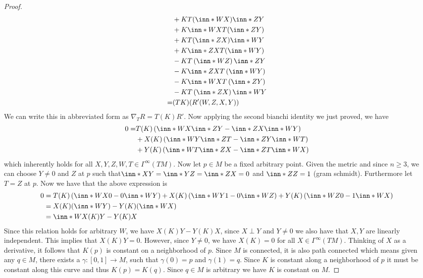 \documentclass[a4paper]{article}
\begin{document}
\begin{proof}
\[\begin{aligned}
                                              &+ KT(\inn*{W}{X})\inn*{Z}{Y} \\
                                              &+ K\inn*{W}{X}T(\inn*{Z}{Y}) \\
                                              &+ KT(\inn*{Z}{X})\inn*{W}{Y} \\
                                              &+ K\inn*{Z}{X}T(\inn*{W}{Y}) \\ 
                                              &- KT \left( \inn*{W}{Z} \right)\inn*{Z}{Y} \\
                                              &- K\inn*{Z}{X} T \left( \inn*{W}{Y} \right) \\
                                              &- K\inn*{W}{X} T \left( \inn*{Z}{Y} \right) \\
                                              &- KT \left( \inn*{Z}{X} \right) \inn*{W}{Y}\\
      =& (TK)(R'(W,Z,X,Y))
    \end{aligned}
  \]
  We can write this in abbreviated form as $\nabla_T R = T(K)R'$. Now applying the second bianchi identity we just proved, we have
  \[
    \begin{aligned}
      0 =& T(K) \left( \inn*{W}{X}\inn*{Z}{Y} - \inn*{Z}{X}\inn*{W}{Y} \right) \\
         &+ X(K) \left( \inn*{W}{Y}\inn*{Z}{T} - \inn*{Z}{Y}\inn*{W}{T} \right) \\
         &+ Y(K) \left( \inn*{W}{T}\inn*{Z}{X} - \inn*{Z}{T}\inn*{W}{X} \right) \\
    \end{aligned}
  \]
  which inherently holds for all $X,Y,Z,W,T \in \Gamma^\infty (TM)$. Now let $p \in M$ be a fixed arbitrary point. Given the metric and since $n \geq 3$, we can choose $Y \neq 0$ and $Z$ at $p$ such that$ \inn*{X}{Y} = \inn*{Y}{Z} = \inn*{Z}{X} = 0$  and  $\inn*{Z}{Z} = 1$ (gram schmidt). Furthermore let $T = Z$ at $p$. Now we have that the above expression is
  \[
    \begin{aligned}
      0 &= T(K)\left( \inn*{W}{X}0 - 0\inn*{W}{Y} \right) + X(K) \left(\inn*{W}{Y}1 - 0\inn*{W}{Z} \right) + Y(K)\left(\inn*{W}{Z}0 - 1\inn*{W}{X} \right) \\
        &= X(K) (\inn*{W}{Y}) - Y(K)(\inn*{W}{X}) \\
        &= \inn*{W}{X(K)Y - Y(K)X}
    \end{aligned}
  \]
  Since this relation holds for arbitrary $W$, we have $X(K)Y - Y(K)X$, since $X \perp Y$ and $Y \neq 0$ we also have that $X,Y$ are linearly independent. This implies that $X(K)Y = 0$. However, since $Y \neq 0$, we have $X(K) = 0$ for all $X \in \Gamma^{\infty}(TM)$. Thinking of $X$ as a derivative, it follows that $K(p) $ is constant on a neighborhood of $p$. Since $M$ is connected, it is also path connected which means given any $q \in M$, there exists a $\gamma: [0,1] \rightarrow M$, such that $\gamma(0) = p$ and $\gamma(1) = q$. Since $K$ is constant along a neighborhood of $p$ it must be constant along this curve and thus $K(p) = K(q)$. Since $q \in M$ is arbitrary we have $K$ is constant on $M$.
\end{proof}
\end{document}
